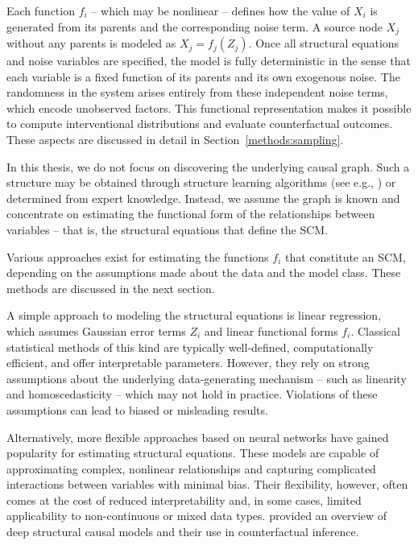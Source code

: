 Each function $f_i$ -- which may be nonlinear -- defines how the value of $X_i$ is generated from its parents and the corresponding noise term. A source node $X_j$ without any parents is modeled as $X_j = f_j(Z_j)$. Once all structural equations and noise variables are specified, the model is fully deterministic in the sense that each variable is a fixed function of its parents and its own exogenous noise. The randomness in the system arises entirely from these independent noise terms, which encode unobserved factors. This functional representation makes it possible to compute interventional distributions and evaluate counterfactual outcomes. These aspects are discussed in detail in Section~\ref{methods:sampling}.

In this thesis, we do not focus on discovering the underlying causal graph. Such a structure may be obtained through structure learning algorithms (see e.g., \citealp{zheng2018}) or determined from expert knowledge. Instead, we assume the graph is known and concentrate on estimating the functional form of the relationships between variables -- that is, the structural equations that define the SCM.

Various approaches exist for estimating the functions $f_i$ that constitute an SCM, depending on the assumptions made about the data and the model class. These methods are discussed in the next section.




%


A simple approach to modeling the structural equations is linear regression, which assumes Gaussian error terms $Z_i$ and linear functional forms $f_i$. Classical statistical methods of this kind are typically well-defined, computationally efficient, and offer interpretable parameters. However, they rely on strong assumptions about the underlying data-generating mechanism -- such as linearity and homoscedasticity -- which may not hold in practice. Violations of these assumptions can lead to biased or misleading results.

Alternatively, more flexible approaches based on neural networks have gained popularity for estimating structural equations. These models are capable of approximating complex, nonlinear relationships and capturing complicated interactions between variables with minimal bias. Their flexibility, however, often comes at the cost of reduced interpretability and, in some cases, limited applicability to non-continuous or mixed data types. \citet{poinsot2024} provided an overview of deep structural causal models and their use in counterfactual inference.

